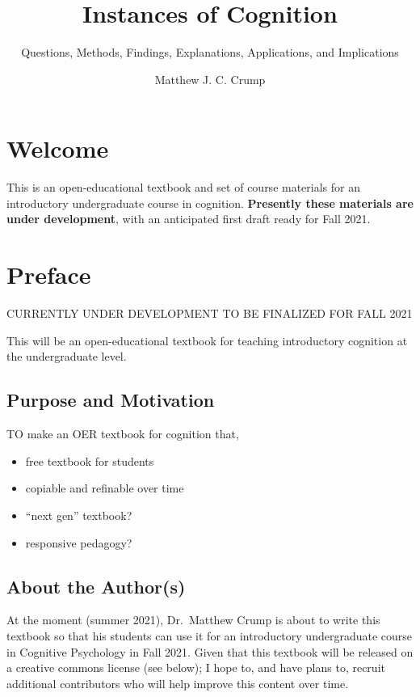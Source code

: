 \documentclass[
  oneside,
  12pt]{crumpbook}
\title{Instances of Cognition}
\subtitle{Questions, Methods, Findings, Explanations, Applications, and Implications}
\author{Matthew J. C. Crump}
\date{}
\providecommand{\tightlist}{%
  \setlength{\itemsep}{0pt}\setlength{\parskip}{0pt}}
\begin{document}
\maketitle

{
\setcounter{tocdepth}{1}
\tableofcontents
}
\hypertarget{welcome}{%
\chapter*{Welcome}\label{welcome}}

This is an open-educational textbook and set of course materials for an introductory undergraduate course in cognition. \textbf{Presently these materials are under development}, with an anticipated first draft ready for Fall 2021.

\hypertarget{preface}{%
\chapter*{Preface}\label{preface}}

CURRENTLY UNDER DEVELOPMENT TO BE FINALIZED FOR FALL 2021

This will be an open-educational textbook for teaching introductory cognition at the undergraduate level.

\hypertarget{purpose-and-motivation}{%
\section{Purpose and Motivation}\label{purpose-and-motivation}}

TO make an OER textbook for cognition that,

\begin{itemize}
\tightlist
\item
  free textbook for students
\item
  copiable and refinable over time
\item
  ``next gen'' textbook?
\item
  responsive pedagogy?
\end{itemize}

\hypertarget{about-the-authors}{%
\section{About the Author(s)}\label{about-the-authors}}

At the moment (summer 2021), Dr.~Matthew Crump is about to write this textbook so that his students can use it for an introductory undergraduate course in Cognitive Psychology in Fall 2021. Given that this textbook will be released on a creative commons license (see below); I hope to, and have plans to, recruit additional contributors who will help improve this content over time.
\end{document}

